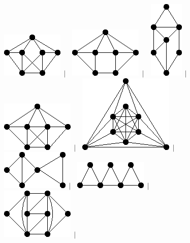 \documentclass[11pt,paper=b5,footinclude,headinclude]{scrbook} %
\newtheorem{ex}{Vaja\hypertarget{sol:\theex}}[chapter]
\begin{document}
\begin{ex}
\begin{figure}
\includegraphics[scale=0.5]{smallGraphs/g_co-X38.png}$\,\mid\,$\
\includegraphics[scale=0.5]{smallGraphs/g_co-X39.png}$\,\mid\,$\
\includegraphics[scale=0.5]{smallGraphs/g_co-X40.png}$\,\mid\,$\
\includegraphics[scale=0.5]{smallGraphs/g_co-X41.png}$\,\mid\,$\
\includegraphics[scale=0.5]{smallGraphs/g_co-X43.png}$\,\mid\,$\
\includegraphics[scale=0.5]{smallGraphs/g_co-X45.png}$\,\mid\,$\
\includegraphics[scale=0.5]{smallGraphs/g_co-X46.png}$\,\mid\,$\
\includegraphics[scale=0.5]{smallGraphs/g_co-X47.png}$\,\mid\,$\

\end{figure}
\end{ex}
\end{document}

